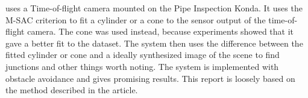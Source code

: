\cite{sintef-tof} uses a Time-of-flight camera mounted on the Pipe Inspection Konda. It
uses the M-SAC criterion to fit a cylinder or a cone to the sensor output of the
time-of-flight camera. The cone was used instead, because experiments showed that it gave
a better fit to the dataset. The system then uses the difference between the fitted
cylinder or cone and
a ideally synthesized image of the scene to find junctions and other things worth noting.
The system is implemented with obstacle avoidance and gives promising results. This report
is loosely based on the method described in the article. 


